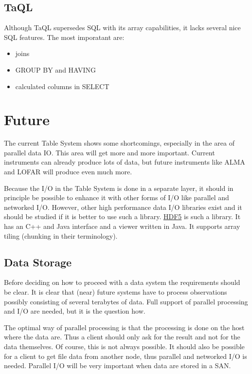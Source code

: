 \subsection{TaQL}
Although TaQL supersedes SQL with its array capabilities, it lacks
several nice SQL features. The most imporatant are:
\begin{itemize}
\item joins
\item GROUP BY and HAVING
\item calculated columns in SELECT
\end{itemize}


\section{Future}
The current Table System shows some shortcomings, especially in the
area of parallel data IO. This area will get more and more important.
Current instruments can already produce lots of data, but future
instruments like ALMA and LOFAR will produce even much more.

Because the I/O in the Table System is done in a separate layer, it
should in principle be possible to enhance it with other forms of
I/O like parallel and networked I/O. However, other high
performance data I/O libraries
exist and it should be studied if it is better to use such a library.
\href{http://hdf.ncsa.uiuc.edu/HDF5}{HDF5} is such a
library. It has an C++ and Java interface and a viewer written in
Java. It supports array tiling (chunking in their terminology).

\subsection{Data Storage}
Before deciding on how to proceed with a data system the requirements 
should be clear.
It is clear that (near) future systems have to process observations
possibly consisting of several terabytes of data. Full support of
parallel processing and I/O are needed, but it is the question how.

The optimal way of parallel processing is that the processing is done
on the host where the data are. Thus a client should only ask for the
result and not for the data themselves. Of course, this is not always
possible. It should also be possible for a client to get file data
from another node, thus parallel and networked I/O is needed.
Parallel I/O will be very important when data are stored in a SAN.

